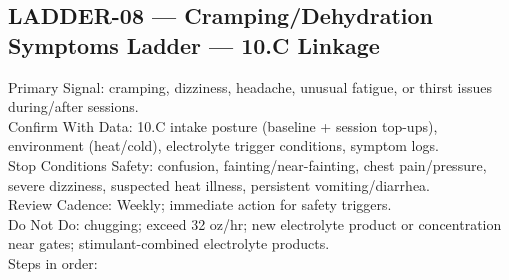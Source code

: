 \documentclass[10pt]{article}
\begin{document}
\newpage

\subsection*{LADDER-08 — Cramping/Dehydration Symptoms Ladder — 10.C Linkage}
{}

Primary Signal: cramping, dizziness, headache, unusual fatigue, or thirst issues during/after sessions.\\
Confirm With Data: 10.C intake posture (baseline + session top-ups), environment (heat/cold), electrolyte trigger conditions, symptom logs.\\
Stop Conditions Safety: confusion, fainting/near-fainting, chest pain/pressure, severe dizziness, suspected heat illness, persistent vomiting/diarrhea.\\
Review Cadence: Weekly; immediate action for safety triggers.\\
Do Not Do: chugging; exceed 32 oz/hr; new electrolyte product or concentration near gates; stimulant-combined electrolyte products.\\
Steps in order:
\end{document}
